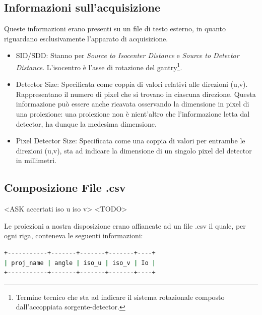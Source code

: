 \documentclass[a4paper,12pt, doubleside]{report}
\begin{document}
            \subsection{Informazioni sull'acquisizione}
                \label{sub:acq_file}
                \par
                    Queste informazioni erano presenti su un file di testo esterno, in quanto riguardano esclusivamente l'apparato di acquisizione. 
                    
                    \begin{itemize}
                        \item SID/SDD: Stanno per \textit{Source to Isocenter Distance} e \textit{Source to Detector Distance}. L'isocentro è l'asse di rotazione del gantry\footnote{Termine tecnico che sta ad indicare il sistema rotazionale composto dall'accoppiata sorgente-detector.}.
                        \item Detector Size: Specificata come coppia di valori relativi alle direzioni (u,v). Rappresentano il numero di pixel che si trovano in ciascuna direzione. Questa informazione può essere anche ricavata osservando la dimensione in pixel di una proiezione: una proiezione non è nient'altro che l'informazione letta dal detector, ha dunque la medesima dimensione.
                        \item Pixel Detector Size: Specificata come una coppia di valori per entrambe le direzioni (u,v), sta ad indicare la dimensione di un singolo pixel del detector in millimetri.
                    \end{itemize}
                    
                    
            
            \subsection{Composizione File .csv}
                \label{sub:csv}
                <ASK accertati iso u iso v> <TODO>
                \par
                    Le proiezioni a nostra disposizione erano affiancate ad un file .csv il quale, per ogni riga, conteneva le seguenti informazioni:
                    \begin{lstlisting}[language=bash, frame=bt]
+-----------+-------+-------+-------+----+
| proj_name | angle | iso_u | iso_v | Io |
+-----------+-------+-------+-------+----+
                    \end{lstlisting}
                    
\end{document}
